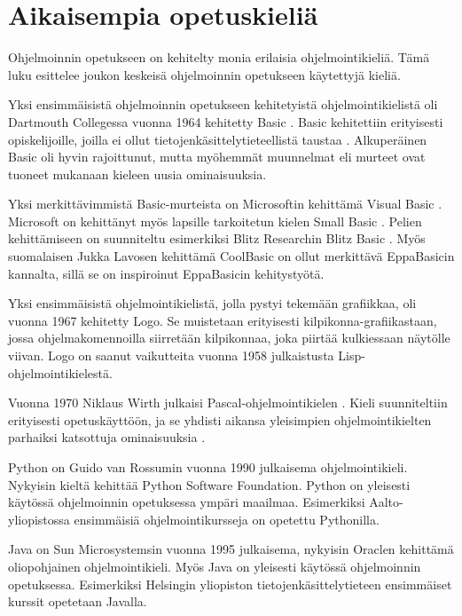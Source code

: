 
\section{Aikaisempia opetuskieliä}
Ohjelmoinnin opetukseen on kehitelty
monia erilaisia ohjelmointikieliä.
Tämä luku esittelee joukon
keskeisä ohjelmoinnin opetukseen
käytettyjä kieliä.

Yksi ensimmäisistä ohjelmoinnin
opetukseen kehitetyistä
ohjelmointikielistä oli
Dartmouth Collegessa vuonna 1964
kehitetty Basic \cite{basic}.
Basic kehitettiin erityisesti
opiskelijoille, joilla ei ollut
tietojenkäsittelytieteellistä
taustaa \cite{language_history}.
Alkuperäinen Basic oli hyvin
rajoittunut, mutta myöhemmät muunnelmat
eli murteet ovat tuoneet mukanaan
kieleen uusia ominaisuuksia.

Yksi merkittävimmistä
Basic-murteista on
Microsoftin kehittämä
Visual Basic \cite{vb.net}.
Microsoft on kehittänyt myös
lapsille tarkoitetun kielen
Small Basic \cite{sb}.
Pelien kehittämiseen on suunniteltu
esimerkiksi Blitz Researchin
Blitz Basic \cite{bb}.
Myös suomalaisen
Jukka Lavosen kehittämä
CoolBasic \cite{cb} on ollut merkittävä
EppaBasicin kannalta, sillä
se on inspiroinut EppaBasicin
kehitystyötä.

Yksi ensimmäisistä ohjelmointikielistä,
jolla pystyi tekemään grafiikkaa,
oli vuonna 1967 kehitetty Logo.
Se muistetaan erityisesti
kilpikonna-grafiikastaan,
jossa ohjelmakomennoilla
siirretään kilpikonnaa,
joka piirtää kulkiessaan
näytölle viivan.
Logo on saanut vaikutteita vuonna 1958
julkaistusta Lisp-ohjelmointikielestä.

Vuonna 1970 Niklaus Wirth
julkaisi Pascal-ohjelmointikielen
\cite{pascal}.
Kieli suunniteltiin erityisesti
opetuskäyttöön, ja se yhdisti
aikansa yleisimpien ohjelmointikielten
parhaiksi katsottuja ominaisuuksia
\cite{language_history}.

Python \cite{python} on
Guido van Rossumin vuonna 1990
julkaisema ohjelmointikieli.
Nykyisin kieltä kehittää
Python Software Foundation.
Python on yleisesti käytössä ohjelmoinnin
opetuksessa ympäri maailmaa.
Esimerkiksi Aalto-yliopistossa
ensimmäisiä ohjelmointikursseja
on opetettu Pythonilla.

Java \cite{java} on Sun Microsystemsin
vuonna 1995 julkaisema,
nykyisin Oraclen kehittämä
oliopohjainen ohjelmointikieli.
Myös Java on yleisesti käytössä
ohjelmoinnin opetuksessa.
Esimerkiksi Helsingin yliopiston
tietojenkäsittelytieteen ensimmäiset
kurssit opetetaan Javalla.

